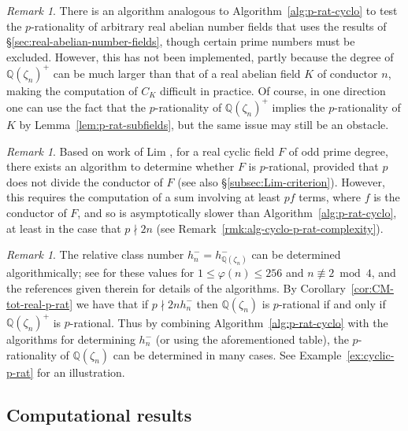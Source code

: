 \documentclass[12pt, a4paper, usenames]{amsart}
\newcommand{\Q}{\mathbb{Q}}
\theoremstyle{plain}
\theoremstyle{remark}
\newtheorem{remark}[theorem]{Remark}
\theoremstyle{definition}
\begin{document}
\begin{remark}
There is an algorithm analogous to 
Algorithm~\ref{alg:p-rat-cyclo} to test the $p$-rationality 
of arbitrary real abelian number fields that uses the results of \S \ref{sec:real-abelian-number-fields}, though certain prime numbers must be excluded. 
However, this has not been implemented, partly because the degree of $\Q(\zeta_{n})^{+}$
can be much larger than that of a real abelian field $K$ of conductor $n$, making the computation of $C_{K}$ difficult in practice. 
Of course, in one direction one can use the fact that 
the $p$-rationality of $\Q(\zeta_{n})^{+}$
implies the $p$-rationality of $K$ by Lemma~\ref{lem:p-rat-subfields}, 
but the same issue may still be an obstacle.
\end{remark}

\begin{remark}\label{rmk:Lim-alg}
Based on work of Lim 
\cite[Proposition~4.1]{MR4330938},
for a real cyclic field $F$ of odd prime degree, there exists an algorithm 
to determine whether $F$ is $p$-rational, provided that $p$ does not divide
the conductor of $F$ (see also \S\ref{subsec:Lim-criterion}).
However, this requires the computation of a sum involving at least $pf$ terms, 
where $f$ is the conductor of $F$, and so is asymptotically slower
than Algorithm~\ref{alg:p-rat-cyclo}, at least in the case that $p \nmid 2n$
(see Remark~\ref{rmk:alg-cyclo-p-rat-complexity}).
\end{remark}

\begin{remark}\label{rmk:p-rat-full-cyclo}
The relative class number $h_{n}^{-}=h_{\Q(\zeta_{n})}^{-}$ can be determined algorithmically;
see \cite[Tables, \S 3]{MR1421575} for these values for $1 \leq \varphi(n) \leq 256$ and $n \not \equiv 2 \bmod{4}$, and the references given therein
for details of the algorithms. 
By Corollary~\ref{cor:CM-tot-real-p-rat} we have that if
$p \nmid 2nh_{n}^{-}$ then $\Q(\zeta_{n})$ is $p$-rational if and only if
$\Q(\zeta_{n})^{+}$ is $p$-rational. Thus by combining 
Algorithm~\ref{alg:p-rat-cyclo} with
the algorithms for determining $h_{n}^{-}$ 
(or using the aforementioned table), the $p$-rationality of $\Q(\zeta_{n})$
can be determined in many cases. See Example~\ref{ex:cyclic-p-rat} for an illustration.
\end{remark}

\subsection{Computational results}\label{subsec:comp-results-real-cyclo}
\end{document}
